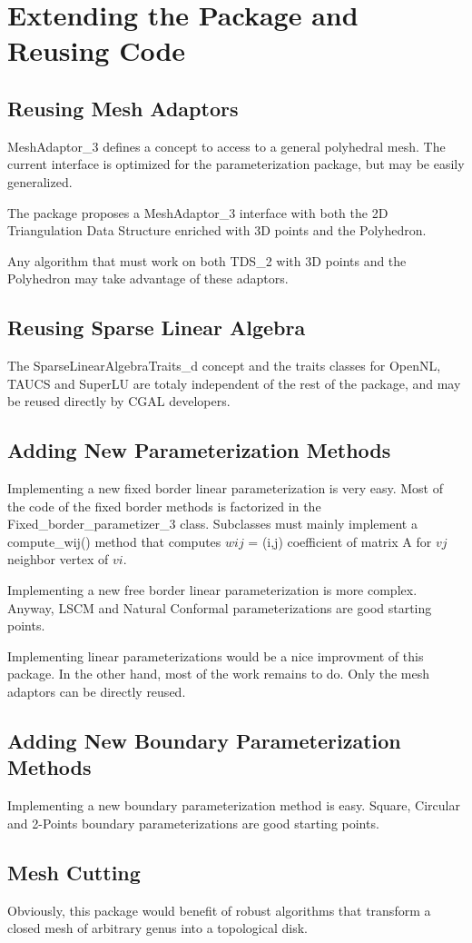 \section{Extending the Package and Reusing Code}

\subsection{Reusing Mesh Adaptors}

MeshAdaptor\_3 defines a concept to access to a general polyhedral mesh.
The current interface is optimized for the parameterization package,
but may be easily generalized.

The package proposes
a MeshAdaptor\_3 interface with both the 2D Triangulation Data Structure enriched
with 3D points and the Polyhedron.

Any algorithm that must work on both TDS\_2 with 3D points and the Polyhedron
may take advantage of these adaptors.


\subsection{Reusing Sparse Linear Algebra}

The SparseLinearAlgebraTraits\_d concept and the traits classes for OpenNL,
TAUCS and SuperLU are totaly independent of the rest of the package,
and may be reused directly by CGAL developers.


\subsection{Adding New Parameterization Methods}

Implementing a new fixed border linear parameterization is very easy.
Most of the code of the fixed border methods
is factorized in the Fixed\_border\_parametizer\_3 class.
Subclasses must mainly implement a compute\_wij() method
that computes $wij$ = (i,j) coefficient of matrix A for $vj$ neighbor vertex of $vi$.

Implementing a new free border linear parameterization is more complex.
Anyway, LSCM and Natural Conformal parameterizations are good starting points.

Implementing  linear parameterizations would be a nice improvment
of this package. In the other hand, most of the work remains to do.
Only the mesh adaptors can be directly reused.


\subsection{Adding New Boundary Parameterization Methods}

Implementing a new boundary parameterization method is easy.
Square, Circular and 2-Points boundary parameterizations are good starting points.


\subsection{Mesh Cutting}

Obviously, this package would benefit of robust algorithms that transform
a closed mesh of arbitrary genus into a topological disk.
